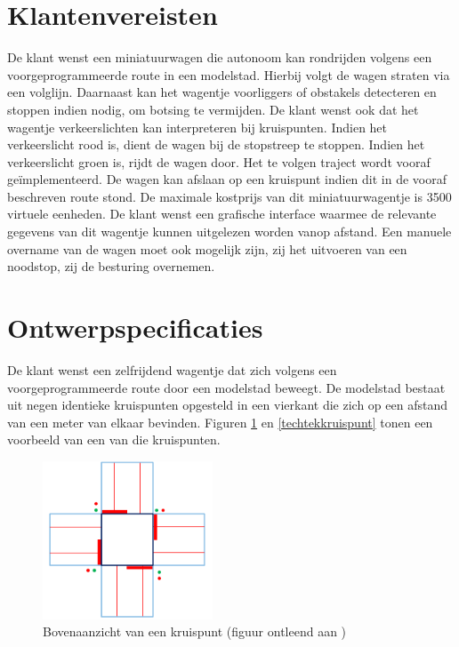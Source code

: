 \documentclass[a4paper,kulak]{kulakarticle}
\begin{document}
\begin{appendices}
\begin{table}[h]
\begin{tabular}{|l|r|r|r|}
	\end{tabular}
\end{table}
\section{Klantenvereisten}
	\renewcommand\refname{} %

De klant wenst een miniatuurwagen die autonoom kan rondrijden volgens een voorgeprogrammeerde route in een modelstad. Hierbij volgt de wagen straten via een volglijn. Daarnaast kan het wagentje voorliggers of obstakels detecteren en stoppen indien nodig, om botsing te vermijden. De klant wenst ook dat het wagentje verkeerslichten kan interpreteren bij kruispunten. Indien het verkeerslicht rood is, dient de wagen bij de stopstreep te stoppen. Indien het verkeerslicht groen is, rijdt de wagen door.  Het te volgen traject wordt vooraf geïmplementeerd. De wagen kan afslaan op een kruispunt indien dit in de vooraf beschreven route stond. De maximale kostprijs van dit miniatuurwagentje is 3500 virtuele eenheden. De klant wenst een grafische interface waarmee de relevante gegevens van dit wagentje kunnen uitgelezen worden vanop afstand. Een manuele overname van de wagen moet ook mogelijk zijn, zij het uitvoeren van een noodstop, zij de besturing overnemen.

\section{Ontwerpspecificaties}
\renewcommand\refname{} %

De klant wenst een zelfrijdend wagentje dat zich volgens een voorgeprogrammeerde route door een modelstad beweegt. De modelstad bestaat uit negen identieke kruispunten opgesteld in een vierkant die zich op een afstand van een meter van elkaar bevinden. Figuren \ref{kruispunt} en \ref{techtekkruispunt} tonen een voorbeeld van een van die kruispunten.

\begin{figure}[h]
	\centering
	\includegraphics[width=0.45\textwidth]{kruispunt.png}
	\caption{Bovenaanzicht van een kruispunt (figuur ontleend aan \cite{teamopdracht})}
	\label{kruispunt}
\end{figure}



\end{appendices}
\end{document}
